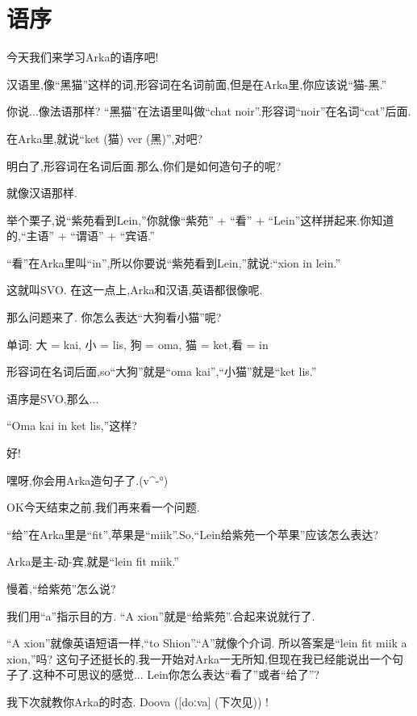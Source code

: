 \chapter[语序]{语序}



今天我们来学习Arka的语序吧!

汉语里,像``黑猫''这样的词,形容词在名词前面,但是在Arka里,你应该说``猫-黑.''


你说...像法语那样? ``黑猫''在法语里叫做``chat noir''.形容词``noir''在名词``cat''后面.

在Arka里,就说``ket (猫) ver (黑)'',对吧?

明白了,形容词在名词后面.那么,你们是如何造句子的呢?


就像汉语那样.

举个栗子,说``紫苑看到Lein,''你就像``紫苑'' + ``看'' + ``Lein''这样拼起来.你知道的,``主语'' + ``谓语'' + ``宾语.''

``看''在Arka里叫``in'',所以你要说``紫苑看到Lein,''就说:``xion in lein.''


这就叫SVO.
在这一点上,Arka和汉语,英语都很像呢.


那么问题来了.
你怎么表达``大狗看小猫''呢?

单词: 大 = kai, 小 = lis, 狗 = oma, 猫 = ket,看 = in


形容词在名词后面,so``大狗''就是``oma kai'',``小猫''就是``ket lis.''

语序是SVO,那么...

``Oma kai in ket lis,''这样?


好!

嘿呀,你会用Arka造句子了.(v\^{}-°)

OK今天结束之前,我们再来看一个问题.

``给''在Arka里是``fit'',苹果是``miik''.So,``Lein给紫苑一个苹果''应该怎么表达?


Arka是主-动-宾,就是``lein fit miik.''

慢着,``给紫苑''怎么说?


我们用``a''指示目的方.
``A xion''就是``给紫苑''.合起来说就行了.


``A xion''就像英语短语一样,``to Shion''.``A''就像个介词.
所以答案是``lein fit miik a xion,''吗?
这句子还挺长的.我一开始对Arka一无所知,但现在我已经能说出一个句子了.这种不可思议的感觉...
Lein你怎么表达``看了''或者``给了''?


我下次就教你Arka的时态. Doova ([doːva] (下次见)) !



